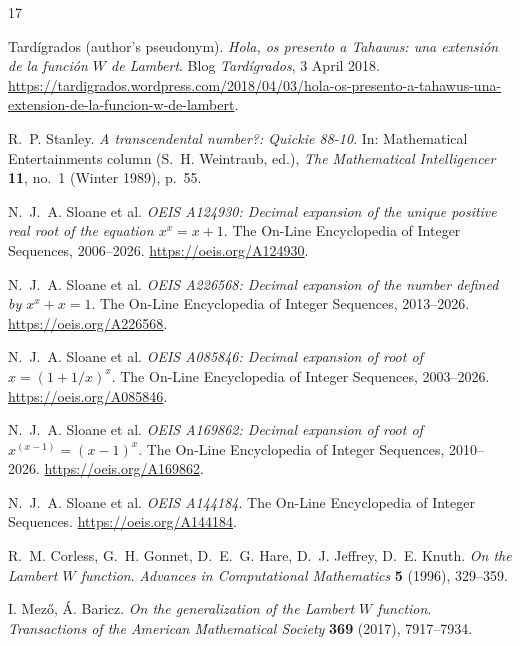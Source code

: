 \documentclass[11pt,a4paper]{article}
\theoremstyle{plain}
\theoremstyle{definition}
\theoremstyle{remark}
\begin{document}
\vspace{14pt}









\begin{thebibliography}{17}\small

Tard\'igrados (author's pseudonym).
\emph{Hola, os presento a Tahawus: una extensi\'on de la funci\'on $W$ de
Lambert}. Blog \emph{Tard\'igrados}, 3 April 2018.
\url{https://tardigrados.wordpress.com/2018/04/03/hola-os-presento-a-tahawus-una-extension-de-la-funcion-w-de-lambert}.

R.~P. Stanley.
\emph{A transcendental number?: Quickie 88-10}.
In: Mathematical Entertainments column (S.~H. Weintraub, ed.),
\emph{The Mathematical Intelligencer} \textbf{11}, no.~1 (Winter 1989), p.~55.

N.~J.~A. Sloane et al.
\emph{OEIS A124930: Decimal expansion of the unique positive real root of the
equation $x^x = x + 1$}. The On-Line Encyclopedia of Integer Sequences,
2006--2026. \url{https://oeis.org/A124930}.

N.~J.~A. Sloane et al.
\emph{OEIS A226568: Decimal expansion of the number defined by $x^x + x = 1$}.
The On-Line Encyclopedia of Integer Sequences, 2013--2026.
\url{https://oeis.org/A226568}.

N.~J.~A. Sloane et al.
\emph{OEIS A085846: Decimal expansion of root of $x = (1+1/x)^x$}.
The On-Line Encyclopedia of Integer Sequences, 2003--2026.
\url{https://oeis.org/A085846}.

N.~J.~A. Sloane et al.
\emph{OEIS A169862: Decimal expansion of root of $x^{(x-1)} = (x-1)^x$}.
The On-Line Encyclopedia of Integer Sequences, 2010--2026.
\url{https://oeis.org/A169862}.

N.~J.~A. Sloane et al.
\emph{OEIS A144184}. The On-Line Encyclopedia of Integer Sequences.
\url{https://oeis.org/A144184}.

R.~M. Corless, G.~H. Gonnet, D.~E.~G. Hare, D.~J. Jeffrey, D.~E. Knuth.
\emph{On the Lambert $W$ function}.
\emph{Advances in Computational Mathematics} \textbf{5} (1996), 329--359.

I. Mez\H{o}, \'A. Baricz.
\emph{On the generalization of the Lambert $W$ function}.
\emph{Transactions of the American Mathematical Society} \textbf{369}
(2017), 7917--7934.


\end{thebibliography}
\end{document}

